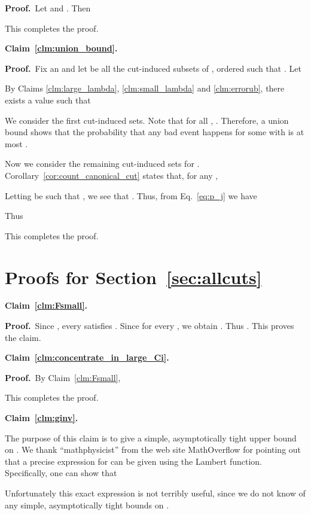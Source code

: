 \documentclass[11pt]{article}
\newcommand{\proofbelow}{8pt}
\numberwithin{equation}{section}
\renewenvironment{proof}{\noindent\textbf{Proof.}\,}{\afterproof}
\newcommand{\afterproof}{\hfill  \par \vspace{\proofbelow}}
\newcommand{\repeatclaim}[2]{\vspace{6pt}\noindent\textbf{#1. }{\it #2} \vspace{6pt}}
\newcommand{\AppendixName}[1]{\label{app:#1}}
\newcommand{\Claim}[1]{Claim~\ref{clm:#1}}
\newcommand{\Corollary}[1]{Corollary~\ref{cor:#1}}
\newcommand{\Equation}[1]{Eq.~\eqref{eq:#1}}
\newcommand{\Section}[1]{Section~\ref{sec:#1}}
\begin{document}
\begin{proof}
Let  and .
Then

This completes the proof.
\end{proof}


\repeatclaim{\Claim{union_bound}}{\clmunionbound}

\begin{proof}
Fix an  and let  be all the cut-induced subsets of ,
ordered such that .
Let

By Claims \ref{clm:large_lambda}, \ref{clm:small_lambda} and \ref{clm:errorub},
there exists a value  such that 

We consider the first  cut-induced sets.
Note that for all , .
Therefore, a union bound shows that
the probability that any bad event happens for some  with 
is at most .

Now we consider the remaining cut-induced sets  for .
\Corollary{count_canonical_cut} states that, for any ,

Letting  be such that ,
we see that .
Thus, from \Equation{p_j} we have

Thus 

This completes the proof.
\end{proof}


\section{Proofs for \Section{allcuts}}
\AppendixName{calcproof}

\repeatclaim{\Claim{Fsmall}}{\clmfsmall}

\begin{proof}
Since , every  satisfies .
Since  for every , we obtain .
Thus .
This proves the claim.
\end{proof}


\repeatclaim{\Claim{concentrate_in_large_Ci}}{\clmconc}

\begin{proof}
By Claim~\ref{clm:Fsmall},

This completes the proof.
\end{proof}


\repeatclaim{\Claim{ginv}}{\clmginv}

The purpose of this claim is to give a simple, asymptotically tight upper bound on .
We thank ``mathphysicist'' from the web site MathOverflow
for pointing out that a precise expression for  can be given using the Lambert  function.
Specifically, one can show that

Unfortunately this exact expression is not terribly useful,
since we do not know of any simple, asymptotically tight bounds on .
\end{document}
